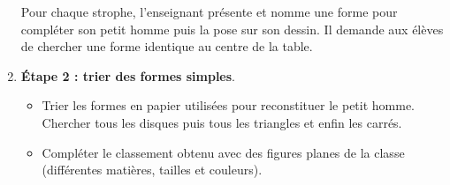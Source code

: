 \begin{exercice*}
\begin{enumerate}
   \begin{center}
   \end{center}

   Pour chaque strophe, l'enseignant présente et nomme une forme pour compléter son petit homme puis la pose sur son dessin. Il demande aux élèves de chercher une forme identique au centre de la table. \\ [-2mm]
   
\item {\bf Étape 2 : trier des formes simples}.
\begin{itemize}
   \item Trier les formes en papier utilisées pour reconstituer le petit homme. Chercher tous les disques puis tous les triangles et enfin les carrés.
   \item Compléter le classement obtenu avec des figures planes de la classe (différentes matières, tailles et couleurs). \\ [-2mm]
\end{itemize}


\end{enumerate}
\end{exercice*}
